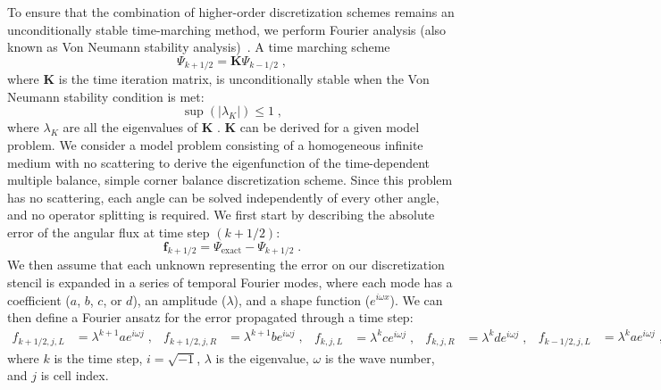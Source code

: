 To ensure that the combination of higher-order discretization schemes remains an unconditionally stable time-marching method, we perform Fourier analysis (also known as Von Neumann stability analysis)~\cite{leveque2007finite}.
A time marching scheme
\begin{equation}
    \Psi_{k+1/2} = \bm{K} \Psi_{k-1/2} \;,
\end{equation}
where $\bm{K}$ is the time iteration matrix, is unconditionally stable when the Von Neumann stability condition is met:
\begin{equation}
    \sup(|\lambda_{K}|) \leq 1 \;,
    \label{eq:unconstab}
\end{equation}
where $\lambda_{K}$ are all the eigenvalues of $\bm{K}$ \cite{golub_matrix_1983, isaacson_numerical_1966}.
$\bm{K}$ can be derived for a given model problem.
We consider a model problem consisting of a homogeneous infinite medium with no scattering to derive the eigenfunction of the time-dependent multiple balance, simple corner balance discretization scheme.
Since this problem has no scattering, each angle can be solved independently of every other angle, and no operator splitting is required.
We first start by describing the absolute error of the angular flux at time step $(k+1/2)$:
\begin{equation}
    \mathbf{f}_{k+1/2} = \Psi_{\text{exact}} - \Psi_{k+1/2} \;.
\end{equation}
We then assume that each unknown representing the error on our discretization stencil is expanded in a series of temporal Fourier modes, where each mode has a coefficient ($a$, $b$, $c$, or $d$), an amplitude ($\lambda$), and a shape function ($e^{i\omega x}$).
We can then define a Fourier ansatz for the error propagated through a time step:
\begin{subequations}
\begin{align}
    f_{k+1/2,j,L} &= \lambda^{k+1}a e^{i\omega j} \; ,
    &
    f_{k+1/2,j,R} &= \lambda^{k+1}b e^{i\omega j} \; ,
\end{align}
\begin{align}
    f_{k,j,L} &= \lambda^{k}c e^{i\omega j} \; ,
    &
    f_{k,j,R} &= \lambda^{k}d e^{i\omega j} \; ,
\end{align}
\begin{align}
    f_{k-1/2,j,L} &= \lambda^{k}a e^{i\omega j} \; ,
    &
    f_{k-1/2,j,R} &= \lambda^{k}b e^{i\omega j} \; ,
\end{align}
\end{subequations}
where $k$ is the time step, $i=\sqrt{-1}$, $\lambda$ is the eigenvalue, $\omega$ is the wave number, and $j$ is cell index. 
